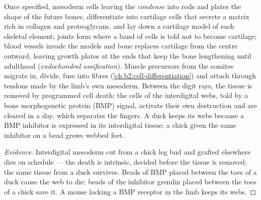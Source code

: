 \begin{proposition}\label{prop:b2:limb-organogenesis:skeleton}
Once specified, mesoderm cells leaving the 
\emph{condense} into rods and plates the shape of the future bones,
differentiate into cartilage cells that secrete a matrix rich in
collagen and proteoglycans, and lay down a cartilage model of each
skeletal element; joints form where a band of cells is told not to
become cartilage; blood vessels invade the models and bone replaces
cartilage from the centre outward, leaving growth plates at the
ends that keep the bone lengthening until adulthood
(\emph{endochondral ossification}). Muscle precursors from the
somites migrate in, divide, fuse into fibres
(\cref{ch:b2:cell-differentiation}) and attach through tendons made
by the limb's own mesoderm. Between the digit rays, the tissue is
removed by programmed cell death: the cells of the interdigital
webs, told by a bone morphogenetic protein (BMP) signal, activate
their own destruction and are cleared in a day, which separates the
fingers. A duck keeps its webs because a BMP inhibitor is expressed
in its interdigital tissue; a chick given the same inhibitor on a
bead grows webbed feet.
\end{proposition}
\begin{proof}[Evidence]
Interdigital mesoderm cut from a chick leg bud and grafted
elsewhere dies on schedule --- the death is intrinsic, decided
before the tissue is removed; the same tissue from a duck survives.
Beads of BMP placed between the toes of a duck cause the web to die;
beads of the inhibitor gremlin placed between the toes of a chick
save it. A mouse lacking a BMP receptor in the limb keeps its webs.
\end{proof}

